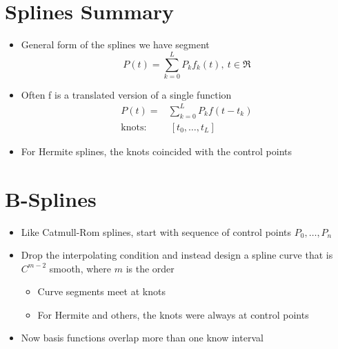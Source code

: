 \documentclass{article}
\begin{document}
\section*{Splines Summary}
\begin{itemize}
    \item General form of the splines we have segment
    \[P(t) = \sum_{k = 0}^L P_k f_k(t),\:t \in \Re\]
    \item Often f is a translated version of a single function
    \begin{align*}
        P(t) =& \sum_{k = 0}^L P_k f(t - t_k)\\
        \text{knots} :& \:[t_0, \dots, t_L]
    \end{align*}
    \item For Hermite splines, the knots coincided with the control points
\end{itemize}

\section*{B-Splines}
\begin{itemize}
    \item Like Catmull-Rom splines, start with sequence of control points $P_0, \dots, P_n$
    \item Drop the interpolating condition and instead design a spline curve that is $C^{m - 2}$ smooth, where $m$ is the order
    \begin{itemize}
        \item Curve segments meet at knots
        \item For Hermite and others, the knots were always at control points
    \end{itemize}
    \item Now basis functions overlap more than one know interval
\end{itemize}
\end{document}
